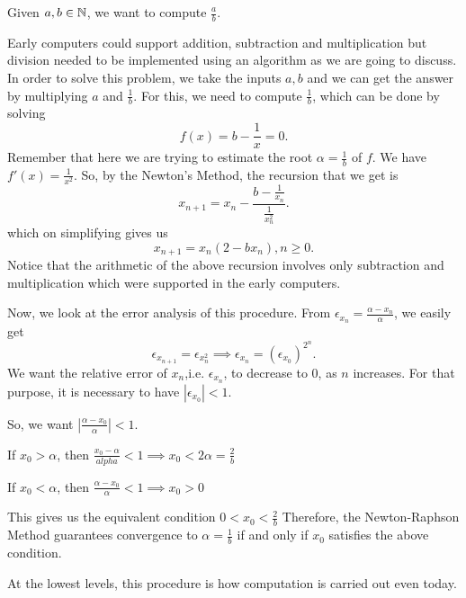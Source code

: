 \begin{example}
	Given $a,b \in \mathbb{N}$, we want to compute $\frac{a}{b}$.
	
	Early computers could support addition, subtraction and multiplication but division needed to be implemented using an algorithm as we are going to discuss.
	In order to solve this problem, we take the inputs $a,b$ and we can get the answer by multiplying  $a$ and  $\frac{1}{b}$. For this, we need to compute $\frac{1}{b}$, which can be done by solving 
	\[
	f(x) = b - \frac{1}{x} = 0
	.\] 
	Remember that here we are trying to estimate the root $\alpha = \frac{1}{b}$ of $f$. 
	We have $f'(x) = \frac{1}{x^2}$. So, by the Newton's Method, the recursion that we get is 
	\[
		x_{n+1} = x_n - \frac{b-\frac{1}{x_n}}{\frac{1}{x_n^2}}
	.\] 
	which on simplifying gives us
	\[
		x_{n+1} = x_n\left( 2-bx_n \right), n \geq 0 
	.\] 
	Notice that the arithmetic of the above recursion involves only subtraction and multiplication which were supported in the early computers.

	Now, we look at the error analysis of this procedure.
	From $\epsilon_x_n = \frac{\alpha-x_n}{\alpha}$, we easily get
	 \[
	 \epsilon_{x_{n+1}} = \epsilon_x_n^2 \implies \epsilon_{x_n} = \left( \epsilon_{x_0} \right)^{2^n} 
	.\] 
	We want the relative error of $x_n$,i.e. $\epsilon_{x_n}$, to decrease to $0$, as $n$ increases.  For that purpose, it is necessary to have $|\epsilon_{x_0}| < 1$.

	So, we want $|\frac{\alpha - x_0}{\alpha}| < 1$.
	\begin{itemize*}
		\item If $x_0 > \alpha$, then  $\frac{x_0-\alpha}{alpha} < 1 \implies x_0 < 2\alpha = \frac{2}{b}$\\
		\item If $ x_0 < \alpha$, then $\frac{\alpha - x_0}{\alpha} < 1 \implies x_0 > 0$
	\end{itemize*}
	This gives us the equivalent condition $0 < x_0 < \frac{2}{b}$ 
	Therefore, the Newton-Raphson Method guarantees convergence to $\alpha = \frac{1}{b}$ if and only if $x_0$ satisfies the above condition.

	At the lowest levels, this procedure is how computation is carried out even today.
\end{example}



